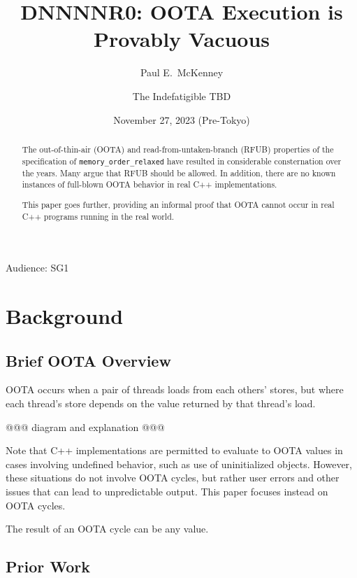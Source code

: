 \documentclass[10]{article}
\begin{document}
\title{DNNNNR0: OOTA Execution is Provably Vacuous}

\newcommand{\co}[1]{\lstinline[breaklines=yes,breakatwhitespace=yes]{#1}}

\author{
Paul E.~McKenney\\ \and
The Indefatigible TBD
}
\date{November 27, 2023 (Pre-Tokyo)}
\maketitle{}

Audience: SG1

\begin{abstract}
	The out-of-thin-air (OOTA) and read-from-untaken-branch (RFUB)
	properties of the specification of \co{memory_order_relaxed}
	have resulted in considerable consternation over the years.
	Many argue that RFUB should be allowed.
	In addition, there are no known instances of full-blown OOTA
	behavior in real C++ implementations.

	This paper goes further, providing an informal proof that OOTA
	cannot occur in real C++ programs running in the real world.
\end{abstract}

\section{Background}
\label{sec:Background}

\subsection{Brief OOTA Overview}
\label{sec:Brief OOTA Overview}

OOTA occurs when a pair of threads loads from each others' stores,
but where each thread's store depends on the value returned by that
thread's load.

@@@ diagram and explanation @@@

Note that C++ implementations are permitted to evaluate to OOTA values
in cases involving undefined behavior, such as use of uninitialized
objects.
However, these situations do not involve OOTA cycles, but rather user
errors and other issues that can lead to unpredictable output.
This paper focuses instead on OOTA cycles.

The result of an OOTA cycle can be any value.

\subsection{Prior Work}
\label{sec:Prior Work}
\end{document}
